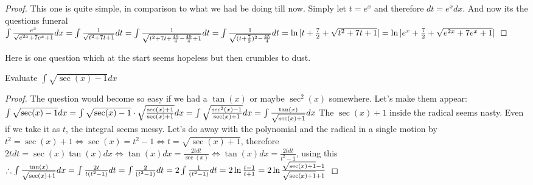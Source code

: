\begin{proof}
    This one is quite simple, in comparison to what we had be doing till now. Simply let $t=e^x$ and therefore $dt=e^x dx$. And now its the  questions funeral\\
    $
    \int \frac{e^x}{\sqrt{e^{2x}+7e^x+1}}dx\\
    = \int \frac{1}{\sqrt{t^2+7t+1}}dt\\
    = \int \frac{1}{\sqrt{t^2+7t+\frac{49}{4}-\frac{49}{4}+1}}dt\\
    = \int \frac{1}{\sqrt{(t+\frac{7}{2})^2-\frac{45}{4}}}dt\\
    = \ln{|t+\frac{7}{2}+\sqrt{t^2+7t+1}|}\\
    = \ln{|e^x+\frac{7}{2}+\sqrt{e^{2x}+7e^x+1}|}\\
    $
\end{proof}
Here is one question which at the start seems hopeless but then crumbles to dust.\\
\begin{example}
    Evaluate $\int \sqrt{\sec(x)-1}dx$
\end{example}
\begin{proof}
    The question would become so easy if we had a $\tan(x)$ or maybe $\sec^2(x)$ somewhere. Let's make them appear:\\
    $
    \int \sqrt{\sec(x)-1}dx\\
    = \int \sqrt{\sec(x)-1} \cdot \sqrt{\frac{\sec(x)+1}{\sec(x)+1}}dx\\
    = \int \sqrt{\frac{\sec^2(x)-1}{\sec(x)+1}}dx\\
    = \int \frac{\tan(x)}{\sqrt{\sec(x)+1}} dx
    $
    The $\sec(x)+1$ inside the radical seems nasty. Even if we take it as $t$, the integral seems messy. Let's do away with the polynomial and the radical in a single motion by $t^2=\sec(x)+1 \iff \sec(x)=t^2-1 \iff t= \sqrt{\sec(x)+1}$, therefore $2tdt=\sec(x)\tan(x)dx \iff \tan(x)dx=\frac{2tdt}{\sec(x)} \iff \tan(x)dx=\frac{2tdt}{t^2-1}$, using this\\
    $
    \therefore \int \frac{\tan(x)}{\sqrt{\sec(x)+1}} dx\\
    = \int \frac{2t}{t(t^2-1)} dt\\
    = \int \frac{2}{(t^2-1)} dt\\
    = 2\int \frac{1}{(t^2-1)} dt\\
    = 2 \ln{\frac{t-1}{t+1}}\\
    = 2 \ln{\frac{\sqrt{\sec(x)+1}-1}{\sqrt{\sec(x)+1}+1}}\\
    $
\end{proof}
